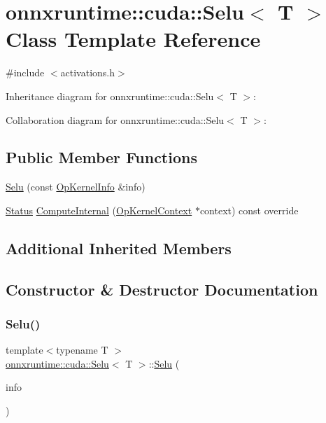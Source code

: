 \hypertarget{classonnxruntime_1_1cuda_1_1Selu}{}\section{onnxruntime\+:\+:cuda\+:\+:Selu$<$ T $>$ Class Template Reference}
\label{classonnxruntime_1_1cuda_1_1Selu}


{\ttfamily \#include $<$activations.\+h$>$}



Inheritance diagram for onnxruntime\+:\+:cuda\+:\+:Selu$<$ T $>$\+:


Collaboration diagram for onnxruntime\+:\+:cuda\+:\+:Selu$<$ T $>$\+:
\subsection*{Public Member Functions}
\begin{DoxyCompactItemize}
\item 
\mbox{\hyperlink{classonnxruntime_1_1cuda_1_1Selu_a11a110f416b9cc89e537e44da814a203}{Selu}} (const \mbox{\hyperlink{classonnxruntime_1_1OpKernelInfo}{Op\+Kernel\+Info}} \&info)
\item 
\mbox{\hyperlink{classonnxruntime_1_1common_1_1Status}{Status}} \mbox{\hyperlink{classonnxruntime_1_1cuda_1_1Selu_aa7d48c140b4f549b220a6493d1c53be9}{Compute\+Internal}} (\mbox{\hyperlink{classonnxruntime_1_1OpKernelContext}{Op\+Kernel\+Context}} $\ast$context) const override
\end{DoxyCompactItemize}
\subsection*{Additional Inherited Members}


\subsection{Constructor \& Destructor Documentation}
\mbox{\label{classonnxruntime_1_1cuda_1_1Selu_a11a110f416b9cc89e537e44da814a203}} 
\subsubsection{\texorpdfstring{Selu()}{Selu()}}
{\footnotesize\ttfamily template$<$typename T $>$ \\
\mbox{\hyperlink{classonnxruntime_1_1cuda_1_1Selu}{onnxruntime\+::cuda\+::\+Selu}}$<$ T $>$\+::\mbox{\hyperlink{classonnxruntime_1_1cuda_1_1Selu}{Selu}} (\begin{DoxyParamCaption}\item[{const \mbox{\hyperlink{classonnxruntime_1_1OpKernelInfo}{Op\+Kernel\+Info}} \&}]{info }\end{DoxyParamCaption})\hspace{0.3cm}{\ttfamily [inline]}}



